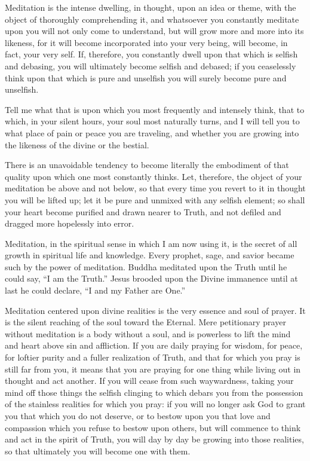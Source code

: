 \documentclass[12pt,oneside]{scrbook}
\begin{document}
  Meditation is the intense dwelling, in thought, upon an idea or theme,
  with the object of thoroughly comprehending it, and whatsoever you
  constantly meditate upon you will not only come to understand, but will
  grow more and more into its likeness, for it will become incorporated
  into your very being, will become, in fact, your very self. If,
  therefore, you constantly dwell upon that which is selfish and debasing,
  you will ultimately become selfish and debased; if you ceaselessly think
  upon that which is pure and unselfish you will surely become pure and
  unselfish.
  
  Tell me what that is upon which you most frequently and intensely think,
  that to which, in your silent hours, your soul most naturally turns, and
  I will tell you to what place of pain or peace you are traveling, and
  whether you are growing into the likeness of the divine or the bestial.
  
  There is an unavoidable tendency to become literally the embodiment of
  that quality upon which one most constantly thinks. Let, therefore, the
  object of your meditation be above and not below, so that every time you
  revert to it in thought you will be lifted up; let it be pure and
  unmixed with any selfish element; so shall your heart become purified
  and drawn nearer to Truth, and not defiled and dragged more hopelessly
  into error.
  
  Meditation, in the spiritual sense in which I am now using it, is the
  secret of all growth in spiritual life and knowledge. Every prophet,
  sage, and savior became such by the power of meditation. Buddha
  meditated upon the Truth until he could say, ``I am the Truth.'' Jesus
  brooded upon the Divine immanence until at last he could declare, ``I
  and my Father are One.''
  
  Meditation centered upon divine realities is the very essence and soul
  of prayer. It is the silent reaching of the soul toward the Eternal.
  Mere petitionary prayer without meditation is a body without a soul, and
  is powerless to lift the mind and heart above sin and affliction. If you
  are daily praying for wisdom, for peace, for loftier purity and a fuller
  realization of Truth, and that for which you pray is still far from you,
  it means that you are praying for one thing while living out in thought
  and act another. If you will cease from such waywardness, taking your
  mind off those things the selfish clinging to which debars you from the
  possession of the stainless realities for which you pray: if you will no
  longer ask God to grant you that which you do not deserve, or to bestow
  upon you that love and compassion which you refuse to bestow upon
  others, but will commence to think and act in the spirit of Truth, you
  will day by day be growing into those realities, so that ultimately you
  will become one with them.
  
\end{document}
